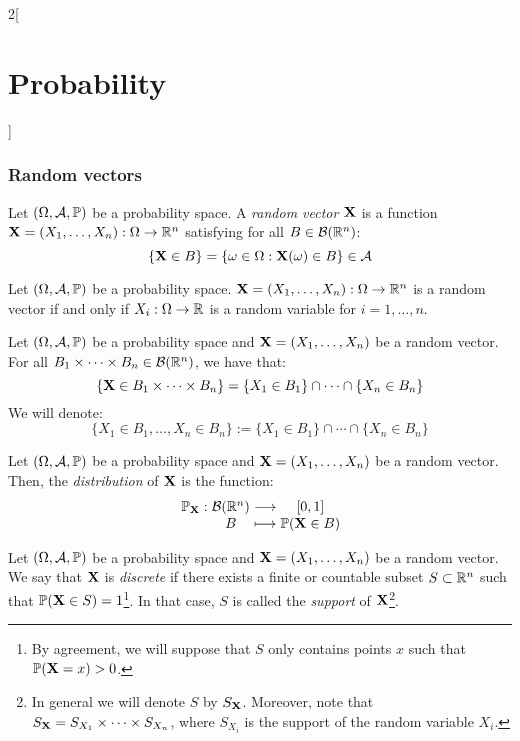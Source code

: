 \documentclass[../../../main.tex]{subfiles}
\begin{document}
\begin{multicols}{2}[\section{Probability}]
    \subsubsection{Random vectors}
    \begin{definition}
        Let $(\Omega,\mathcal{A},\mathbb{P})$ be a probability space. A \textit{random vector $\boldsymbol{\mathrm{X}}$} is a function $\boldsymbol{\mathrm{X}}=(X_1,\ldots,X_n):\Omega\rightarrow\mathbb{R}^n$ satisfying for all $B\in\mathcal{B}(\mathbb{R}^n)$: $$\{\boldsymbol{\mathrm{X}}\in B\}=\{\omega\in\Omega:\boldsymbol{\mathrm{X}}(\omega)\in B\}\in\mathcal{A}$$
    \end{definition}
    \begin{prop}
        Let $(\Omega,\mathcal{A},\mathbb{P})$ be a probability space. $\boldsymbol{\mathrm{X}}=(X_1,\ldots,X_n):\Omega\rightarrow\mathbb{R}^n$ is a random vector if and only if $X_i:\Omega\rightarrow\mathbb{R}$ is a random variable for $i=1,\ldots,n$.
    \end{prop}
    \begin{definition}
        Let $(\Omega,\mathcal{A},\mathbb{P})$ be a probability space and $\boldsymbol{\mathrm{X}}=(X_1,\ldots,X_n)$ be a random vector. For all $B_1\times\cdots\times B_n\in\mathcal{B}(\mathbb{R}^n)$, we have that: $$\{\boldsymbol{\mathrm{X}}\in B_1\times\cdots\times B_n\}=\{X_1\in B_1\}\cap\cdots\cap\{X_n\in B_n\}$$ We will denote: $$\{X_1\in B_1,\ldots,X_n\in B_n\}:=\{X_1\in B_1\}\cap\cdots\cap\{X_n\in B_n\}$$
    \end{definition}
    \begin{definition}
        Let $(\Omega,\mathcal{A},\mathbb{P})$ be a probability space and $\boldsymbol{\mathrm{X}}=(X_1,\ldots,X_n)$ be a random vector. Then, the \textit{distribution} of $\boldsymbol{\mathrm{X}}$ is the function:
        $$
            \function{\Prob_{\vf{X}}}{\mathcal{B}(\RR^n)}{[0,1]}{B}{\Prob(\vf{X}\in B)}
        $$
    \end{definition}
    \begin{definition}
        Let $(\Omega,\mathcal{A},\mathbb{P})$ be a probability space and $\boldsymbol{\mathrm{X}}=(X_1,\ldots,X_n)$ be a random vector. We say that $\boldsymbol{\mathrm{X}}$ is \textit{discrete} if there exists a finite or countable subset $S\subset\mathbb{R}^n$ such that $\mathbb{P}(\boldsymbol{\mathrm{X}}\in S)=1$\footnote{By agreement, we will suppose that $S$ only contains points $x$ such that $\mathbb{P}(\boldsymbol{\mathrm{X}}=x)>0$.}. In that case, $S$ is called the \textit{support} of $\boldsymbol{\mathrm{X}}$\footnote{In general we will denote $S$ by $S_{\boldsymbol{\mathrm{X}}}$. Moreover, note that $S_{\boldsymbol{\mathrm{X}}}=S_{X_1}\times\cdots\times S_{X_n}$, where $S_{X_i}$ is the support of the random variable $X_i$.}.
    \end{definition}
    \begin{prop}

\end{prop}
\end{multicols}
\end{document}
